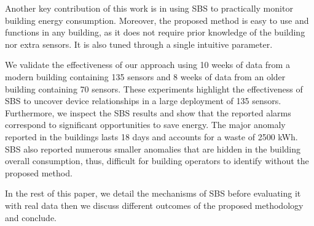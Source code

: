 Another key contribution of this work is in using SBS to practically monitor building energy consumption.
Moreover, the proposed method is easy to use and functions in any building, as it does not require prior knowledge of the building nor extra sensors.  
It is also tuned through a single intuitive parameter.  %

We validate the effectiveness of our approach using 10 weeks of data from a modern building containing 135 sensors and 
8 weeks of data from an older building containing 70 sensors.
These experiments highlight the effectiveness of SBS to uncover device relationships in a large deployment of 135 sensors.
Furthermore, we inspect the SBS results and show that the reported alarms correspond to significant opportunities to save energy.
The major anomaly reported in the buildings lasts 18 days and accounts for a waste of 2500 kWh. %
SBS also reported numerous smaller anomalies that are hidden in the building overall consumption, thus, difficult for building operators to identify without the proposed method.

In the rest of this paper, we detail the mechanisms of SBS before evaluating it with real data then we discuss different outcomes of the proposed methodology and conclude.
